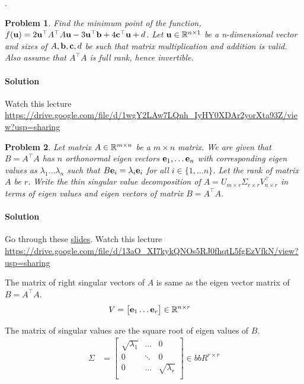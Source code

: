 \documentclass{article}
\newtheorem{prob}{Problem}
\begin{document}
\newpage
.
\newpage

\begin{prob}
  Find the minimum point of the function, $f(\mathbf{u}) = 2 \mathbf{u}^\top A^\top A \mathbf{u} - 3 \mathbf{u}^\top\mathbf{b} +
  4 \mathbf{c}^\top \mathbf{u} + d$. Let $\mathbf{u} \in \mathbb{R}^{n \times 1}$ be a n-dimensional vector and sizes of $A, \mathbf{b}, \mathbf{c}, d$
  be such that matrix multiplication and addition is valid. Also assume that $A^\top A$  is
  full rank, hence invertible.
\end{prob}

\paragraph*{Solution}
Watch this lecture \url{https://drive.google.com/file/d/1wgY2LAw7LQnh_IyHY0XDAr2yorXta93Z/view?usp=sharing}

\begin{prob}
  Let matrix $A \in \mathbb{R}^{m \times n}$ be a $m \times n$ matrix. We are given
  that $B = A^\top A$ has $n$ orthonormal eigen vectors $\mathbf{e}_1, \dots \mathbf{e}_n$ with
  corresponding eigen values as $\lambda_1 \dots \lambda_n$ such that $B\mathbf{e}_i =
  \lambda_i \mathbf{e}_i$ for all $i \in \{1, \dots n\}$. Let the rank of
  matrix $A$ be $r$. Write the thin singular
  value decomposition of $A = U_{m \times r} \Sigma_{r \times r} V^\top_{n
    \times r}$  in terms of eigen values and
  eigen vectors of matrix $B = A^\top A$.
\end{prob}

\paragraph*{Solution}
Go through these \href{https://vikasdhiman.info/ECE417-Mobile-Robots/slides/03-07-linear-algebra_files/main.pdf.pdf}{slides}.
Watch this lecture \url{https://drive.google.com/file/d/13aO_XI7kykQNOs5RJ0fhqtL5fgEzVfkN/view?usp=sharing}

The matrix of right singular vectors of $A$ is same as the eigen vector matrix
of $B = A^\top A$.
\begin{align}
  V &= \begin{bmatrix} \mathbf{e}_1 \dots \mathbf{e}_r \end{bmatrix} \in \mathbb{R}^{n \times r}
\end{align}

The matrix of singular values are the square root of eigen values of $B$.
\begin{align}
  \Sigma &= \begin{bmatrix}
    \sqrt{\lambda_1} & \dots & 0 \\
    0 &  \ddots & 0 \\
    0 & \dots & \sqrt{\lambda_r} \\
    \end{bmatrix} \in bbR^{r \times r}
\end{align}
\end{document}
